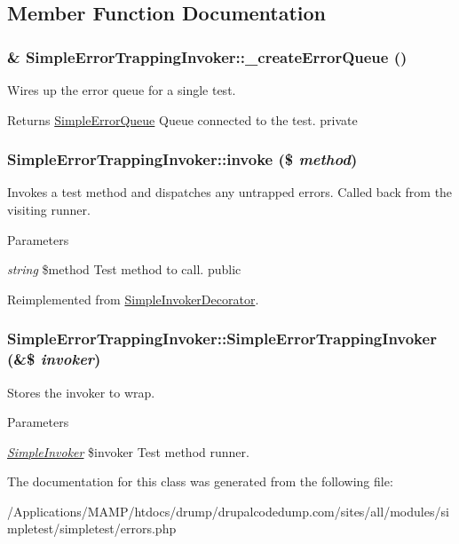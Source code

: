 \subsection{Member Function Documentation}
\hypertarget{class_simple_error_trapping_invoker_a721fa4b7d6c984e87648c5d3b08e35e1}{
\subsubsection[{\_\-createErrorQueue}]{\setlength{\rightskip}{0pt plus 5cm}\& SimpleErrorTrappingInvoker::\_\-createErrorQueue ()}}
\label{class_simple_error_trapping_invoker_a721fa4b7d6c984e87648c5d3b08e35e1}
Wires up the error queue for a single test. \begin{DoxyReturn}{Returns}
\hyperlink{class_simple_error_queue}{SimpleErrorQueue} Queue connected to the test.  private 
\end{DoxyReturn}
\hypertarget{class_simple_error_trapping_invoker_ad9122507df8d27c3b7ab8fd1ecb53e45}{
\subsubsection[{invoke}]{\setlength{\rightskip}{0pt plus 5cm}SimpleErrorTrappingInvoker::invoke (\$ {\em method})}}
\label{class_simple_error_trapping_invoker_ad9122507df8d27c3b7ab8fd1ecb53e45}
Invokes a test method and dispatches any untrapped errors. Called back from the visiting runner. 
\begin{DoxyParams}{Parameters}
\item[{\em string}]\$method Test method to call.  public \end{DoxyParams}


Reimplemented from \hyperlink{class_simple_invoker_decorator_a95431eef2d336fc92dbbc719a66cda32}{SimpleInvokerDecorator}.\hypertarget{class_simple_error_trapping_invoker_af403fe699963304b0d95f4bc1366d6b8}{
\subsubsection[{SimpleErrorTrappingInvoker}]{\setlength{\rightskip}{0pt plus 5cm}SimpleErrorTrappingInvoker::SimpleErrorTrappingInvoker (\&\$ {\em invoker})}}
\label{class_simple_error_trapping_invoker_af403fe699963304b0d95f4bc1366d6b8}
Stores the invoker to wrap. 
\begin{DoxyParams}{Parameters}
\item[{\em \hyperlink{class_simple_invoker}{SimpleInvoker}}]\$invoker Test method runner. \end{DoxyParams}


The documentation for this class was generated from the following file:\begin{DoxyCompactItemize}
\item 
/Applications/MAMP/htdocs/drump/drupalcodedump.com/sites/all/modules/simpletest/simpletest/errors.php\end{DoxyCompactItemize}
